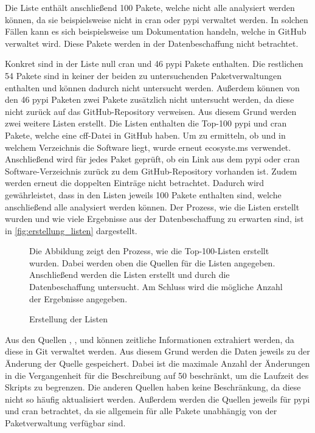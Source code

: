 Die Liste enthält anschließend 100 Pakete, welche nicht alle analysiert werden können, da sie beispielsweise nicht in \gls{cran} oder \gls{pypi} verwaltet werden.
In solchen Fällen kann es sich beispielsweise um Dokumentation handeln, welche in GitHub verwaltet wird.
Diese Pakete werden in der Datenbeschaffung nicht betrachtet.

Konkret sind in der Liste null \gls{cran} und 46 \gls{pypi} Pakete enthalten.
Die restlichen 54 Pakete sind in keiner der beiden zu untersuchenden Paketverwaltungen enthalten und können dadurch nicht untersucht werden.
Außerdem können von den 46 \gls{pypi} Paketen zwei Pakete zusätzlich nicht untersucht werden, da diese nicht zurück auf das GitHub-Repository verweisen.
Aus diesem Grund werden zwei weitere Listen erstellt.
Die Listen enthalten die Top-100 \gls{pypi} und \gls{cran} Pakete, welche eine \gls{cff}-Datei in GitHub haben.
Um zu ermitteln, ob und in welchem Verzeichnis die Software liegt, wurde erneut ecosyste.ms verwendet.
Anschließend wird für jedes Paket geprüft, ob ein Link aus dem \gls{pypi} oder \gls{cran} Software-Verzeichnis zurück zu dem GitHub-Repository vorhanden ist.
Zudem werden erneut die doppelten Einträge nicht betrachtet.
Dadurch wird gewährleistet, dass in den Listen jeweils 100 Pakete enthalten sind, welche anschließend alle analysiert werden können.
Der Prozess, wie die Listen erstellt wurden und wie viele Ergebnisse aus der Datenbeschaffung zu erwarten sind, ist in \autoref{fig:erstellung_listen} dargestellt.

\begin{figure}
    \begin{center}
        
    \end{center}
    \caption{Erstellung der Listen}
    \label{fig:erstellung_listen}
    \small
    Die Abbildung zeigt den Prozess, wie die Top-100-Listen erstellt wurden. Dabei werden oben die Quellen für die Listen angegeben. Anschließend werden die Listen erstellt und durch die Datenbeschaffung untersucht. Am Schluss wird die mögliche Anzahl der Ergebnisse angegeben.
\end{figure}

Aus den Quellen , ,  und  können zeitliche Informationen extrahiert werden, da diese in Git verwaltet werden.
Aus diesem Grund werden die Daten jeweils zu der Änderung der Quelle gespeichert.
Dabei ist die maximale Anzahl der Änderungen in die Vergangenheit für die Beschreibung auf 50 beschränkt, um die Laufzeit des Skripts zu begrenzen.
Die anderen Quellen haben keine Beschränkung, da diese nicht so häufig aktualisiert werden.
Außerdem werden die Quellen jeweils für \gls{pypi} und \gls{cran} betrachtet, da sie allgemein für alle Pakete unabhängig von der Paketverwaltung verfügbar sind.


